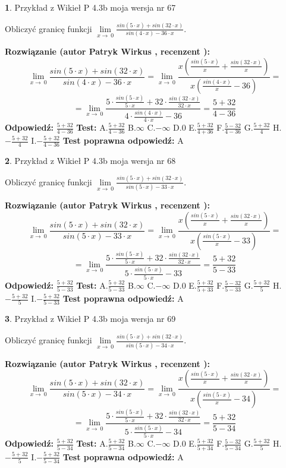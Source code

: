\documentclass[12pt, a4paper]{article}
\theoremstyle{definition} %
\newtheorem{zad}{}
\newcommand{\zadStart}[1]{\begin{zad}#1\newline}
\newcommand{\zadStop}{\end{zad}}
\newcommand{\rozwStart}[2]{\noindent \textbf{Rozwiązanie (autor #1 , recenzent #2): }\newline}
\newcommand{\rozwStop}{\newline}
\newcommand{\odpStart}{\noindent \textbf{Odpowiedź:}\newline}
\newcommand{\odpStop}{\newline}
\newcommand{\testStart}{\noindent \textbf{Test:}\newline}
\newcommand{\testStop}{\newline}
\newcommand{\kluczStart}{\noindent \textbf{Test poprawna odpowiedź:}\newline}
\newcommand{\kluczStop}{\newline}
\begin{document}
\zadStart{Przykład z Wikieł P 4.3b moja wersja nr 67}


Obliczyć granicę funkcji $\lim\limits_{x\to\ 0}\frac{sin(5 \cdot x)+sin(32 \cdot x)}{sin(4 \cdot x)-36 \cdot x}$.
\zadStop
\rozwStart{Patryk Wirkus}{}
$$\lim\limits_{x\to\ 0}\frac{sin(5 \cdot x)+sin(32 \cdot x)}{sin(4 \cdot x)-36 \cdot x}=\lim\limits_{x\to\ 0}\frac{x(\frac{sin(5 \cdot x)}{x}+\frac{sin(32 \cdot x)}{x})}{x(\frac{sin(4 \cdot x)}{x}-36)}=$$
$$=\lim\limits_{x\to\ 0}\frac{5 \cdot \frac{sin(5 \cdot x)}{5 \cdot x}+32 \cdot \frac{sin(32 \cdot x)}{32 \cdot x}}{4 \cdot \frac{sin(4 \cdot x)}{4 \cdot x}-36}=\frac{5+32}{4-36}$$
\rozwStop
\odpStart
$\frac{5+32}{4-36}$
\odpStop
\testStart
A.$\frac{5+32}{4-36}$
B.$\infty$
C.$-\infty$
D.$0$
E.$\frac{5+32}{4+36}$
F.$\frac{5-32}{4-36}$
G.$\frac{5+32}{4}$
H.$-\frac{5+32}{4}$
I.$-\frac{5+32}{4-36}$
\testStop
\kluczStart
A
\kluczStop



\zadStart{Przykład z Wikieł P 4.3b moja wersja nr 68}


Obliczyć granicę funkcji $\lim\limits_{x\to\ 0}\frac{sin(5 \cdot x)+sin(32 \cdot x)}{sin(5 \cdot x)-33 \cdot x}$.
\zadStop
\rozwStart{Patryk Wirkus}{}
$$\lim\limits_{x\to\ 0}\frac{sin(5 \cdot x)+sin(32 \cdot x)}{sin(5 \cdot x)-33 \cdot x}=\lim\limits_{x\to\ 0}\frac{x(\frac{sin(5 \cdot x)}{x}+\frac{sin(32 \cdot x)}{x})}{x(\frac{sin(5 \cdot x)}{x}-33)}=$$
$$=\lim\limits_{x\to\ 0}\frac{5 \cdot \frac{sin(5 \cdot x)}{5 \cdot x}+32 \cdot \frac{sin(32 \cdot x)}{32 \cdot x}}{5 \cdot \frac{sin(5 \cdot x)}{5 \cdot x}-33}=\frac{5+32}{5-33}$$
\rozwStop
\odpStart
$\frac{5+32}{5-33}$
\odpStop
\testStart
A.$\frac{5+32}{5-33}$
B.$\infty$
C.$-\infty$
D.$0$
E.$\frac{5+32}{5+33}$
F.$\frac{5-32}{5-33}$
G.$\frac{5+32}{5}$
H.$-\frac{5+32}{5}$
I.$-\frac{5+32}{5-33}$
\testStop
\kluczStart
A
\kluczStop



\zadStart{Przykład z Wikieł P 4.3b moja wersja nr 69}


Obliczyć granicę funkcji $\lim\limits_{x\to\ 0}\frac{sin(5 \cdot x)+sin(32 \cdot x)}{sin(5 \cdot x)-34 \cdot x}$.
\zadStop
\rozwStart{Patryk Wirkus}{}
$$\lim\limits_{x\to\ 0}\frac{sin(5 \cdot x)+sin(32 \cdot x)}{sin(5 \cdot x)-34 \cdot x}=\lim\limits_{x\to\ 0}\frac{x(\frac{sin(5 \cdot x)}{x}+\frac{sin(32 \cdot x)}{x})}{x(\frac{sin(5 \cdot x)}{x}-34)}=$$
$$=\lim\limits_{x\to\ 0}\frac{5 \cdot \frac{sin(5 \cdot x)}{5 \cdot x}+32 \cdot \frac{sin(32 \cdot x)}{32 \cdot x}}{5 \cdot \frac{sin(5 \cdot x)}{5 \cdot x}-34}=\frac{5+32}{5-34}$$
\rozwStop
\odpStart
$\frac{5+32}{5-34}$
\odpStop
\testStart
A.$\frac{5+32}{5-34}$
B.$\infty$
C.$-\infty$
D.$0$
E.$\frac{5+32}{5+34}$
F.$\frac{5-32}{5-34}$
G.$\frac{5+32}{5}$
H.$-\frac{5+32}{5}$
I.$-\frac{5+32}{5-34}$
\testStop
\kluczStart
A
\kluczStop
\end{document}
